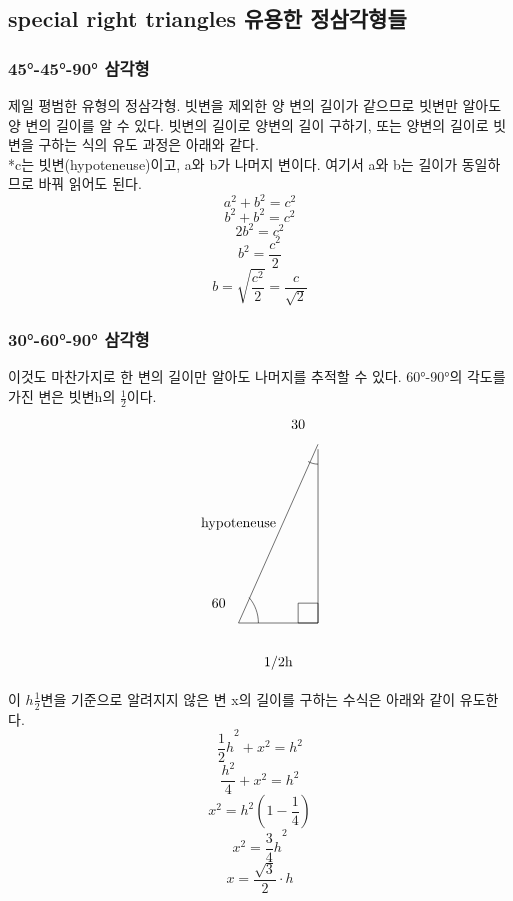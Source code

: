 \documentclass{article}
\begin{document}
\subsection{special right triangles 유용한 정삼각형들}
\subsubsection{\ang{45}-\ang{45}-\ang{90} 삼각형}
제일 평범한 유형의 정삼각형. 빗변을 제외한 양 변의 길이가 같으므로 빗변만 알아도 양 변의 길이를 알 수 있다. 빗변의 길이로 양변의 길이 구하기, 또는 양변의 길이로 빗변을 구하는 식의 유도 과정은 아래와 같다.\\
*c는 빗변(hypoteneuse)이고, a와 b가 나머지 변이다. 여기서 a와 b는 길이가 동일하므로 바꿔 읽어도 된다.
$$a^{2}+b^{2}=c^{2}$$
$$b^{2}+b^{2}=c^{2}$$
$$2b^{2}=c^{2}$$
$$b^{2}=\frac{c^{2}}{2}$$
$$b=\sqrt{\frac{c^{2}}{2}}=\frac{c}{\sqrt{2}}$$
\subsubsection{\ang{30}-\ang{60}-\ang{90} 삼각형}
이것도 마찬가지로 한 변의 길이만 알아도 나머지를 추적할 수 있다. \ang{60}-\ang{90}의 각도를 가진 변은 빗변h의 $\frac{1}{2}$이다.
$$
\begin{tikzpicture}

\draw (2,3) node (v1) {} -- (0,-1.5) -- (2,-1.5) -- (v1);
\draw (0.5,-1.5) arc (0:40:1);


\draw (2,2.5) arc (-89.999:-120:0.5);
\draw  (2,-1) rectangle (1.5,-1.5);
\node at (-0.5,-1) {60};
\node at (1.5,3.5) {30};
\node at (0,1) {hypoteneuse};
\node at (1,-2.5) {1/2h};
\end{tikzpicture}
$$
이 $h\frac{1}{2}$변을 기준으로 알려지지 않은 변 x의 길이를 구하는 수식은 아래와 같이 유도한다.
$${\frac{1}{2}h}^{2}+x^{2}=h^{2}$$
$$\frac{h^{2}}{4}+x^{2}=h^{2}$$
$$x^{2}=h^{2}(1-\frac{1}{4})$$
$$x^{2}={\frac{3}{4}h}^{2}$$
$$x={\frac{\sqrt{3}}{2}}{\cdot}h$$
\end{document}
